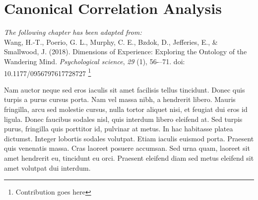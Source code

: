 \chapter{Canonical Correlation Analysis}
\label{ch:methods}


\textit{The following chapter has been adapted from:\\}
Wang, H.-T., Poerio, G. L., Murphy, C. E., Bzdok, D., Jefferies, E., \& Smallwood, J. (2018). Dimensions of Experience: Exploring the Ontology of the Wandering Mind. \textit{Psychological science}, \textit{29} (1), 56-–71. doi: 10.1177/0956797617728727
\footnote{
Contribution goes here
}\\
\newpage

\noindent{}Nam auctor neque sed eros iaculis sit amet facilisis tellus tincidunt. Donec quis turpis a purus cursus porta. Nam vel massa nibh, a hendrerit libero. Mauris fringilla, arcu sed molestie cursus, nulla tortor aliquet nisi, et feugiat dui eros id ligula. Donec faucibus sodales nisl, quis interdum libero eleifend at. Sed turpis purus, fringilla quis porttitor id, pulvinar at metus. In hac habitasse platea dictumst. Integer lobortis sodales volutpat. Etiam iaculis euismod porta. Praesent quis venenatis massa. Cras laoreet posuere accumsan. Sed urna quam, laoreet sit amet hendrerit eu, tincidunt eu orci. Praesent eleifend diam sed metus eleifend sit amet volutpat dui interdum.


